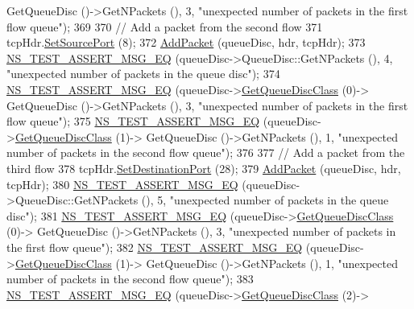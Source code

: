 \begin{DoxyCode}
      GetQueueDisc ()->GetNPackets (), 3, \textcolor{stringliteral}{"unexpected number of packets in the first flow queue"});
369 
370   \textcolor{comment}{// Add a packet from the second flow}
371   tcpHdr.\hyperlink{classns3_1_1TcpHeader_aceb2630b3d43118ee576aec58f55a0ff}{SetSourcePort} (8);
372   \hyperlink{classFqCoDelQueueDiscTCPFlowsSeparation_ae3d3e59d786d4cc53a9140ac1a870a4b}{AddPacket} (queueDisc, hdr, tcpHdr);
373   \hyperlink{group__testing_ga2a9d78cffb3db8e867c35fff0b698cf5}{NS\_TEST\_ASSERT\_MSG\_EQ} (queueDisc->QueueDisc::GetNPackets (), 4, \textcolor{stringliteral}{"unexpected number
       of packets in the queue disc"});
374   \hyperlink{group__testing_ga2a9d78cffb3db8e867c35fff0b698cf5}{NS\_TEST\_ASSERT\_MSG\_EQ} (queueDisc->\hyperlink{classns3_1_1QueueDisc_a584d228f7bff3f754d32793a38134556}{GetQueueDiscClass} (0)->
      GetQueueDisc ()->GetNPackets (), 3, \textcolor{stringliteral}{"unexpected number of packets in the first flow queue"});
375   \hyperlink{group__testing_ga2a9d78cffb3db8e867c35fff0b698cf5}{NS\_TEST\_ASSERT\_MSG\_EQ} (queueDisc->\hyperlink{classns3_1_1QueueDisc_a584d228f7bff3f754d32793a38134556}{GetQueueDiscClass} (1)->
      GetQueueDisc ()->GetNPackets (), 1, \textcolor{stringliteral}{"unexpected number of packets in the second flow queue"});
376 
377   \textcolor{comment}{// Add a packet from the third flow}
378   tcpHdr.\hyperlink{classns3_1_1TcpHeader_a3259c06373ba4261eaaaed0cbf40cad3}{SetDestinationPort} (28);
379   \hyperlink{classFqCoDelQueueDiscTCPFlowsSeparation_ae3d3e59d786d4cc53a9140ac1a870a4b}{AddPacket} (queueDisc, hdr, tcpHdr);
380   \hyperlink{group__testing_ga2a9d78cffb3db8e867c35fff0b698cf5}{NS\_TEST\_ASSERT\_MSG\_EQ} (queueDisc->QueueDisc::GetNPackets (), 5, \textcolor{stringliteral}{"unexpected number
       of packets in the queue disc"});
381   \hyperlink{group__testing_ga2a9d78cffb3db8e867c35fff0b698cf5}{NS\_TEST\_ASSERT\_MSG\_EQ} (queueDisc->\hyperlink{classns3_1_1QueueDisc_a584d228f7bff3f754d32793a38134556}{GetQueueDiscClass} (0)->
      GetQueueDisc ()->GetNPackets (), 3, \textcolor{stringliteral}{"unexpected number of packets in the first flow queue"});
382   \hyperlink{group__testing_ga2a9d78cffb3db8e867c35fff0b698cf5}{NS\_TEST\_ASSERT\_MSG\_EQ} (queueDisc->\hyperlink{classns3_1_1QueueDisc_a584d228f7bff3f754d32793a38134556}{GetQueueDiscClass} (1)->
      GetQueueDisc ()->GetNPackets (), 1, \textcolor{stringliteral}{"unexpected number of packets in the second flow queue"});
383   \hyperlink{group__testing_ga2a9d78cffb3db8e867c35fff0b698cf5}{NS\_TEST\_ASSERT\_MSG\_EQ} (queueDisc->\hyperlink{classns3_1_1QueueDisc_a584d228f7bff3f754d32793a38134556}{GetQueueDiscClass} (2)->

\end{DoxyCode}
